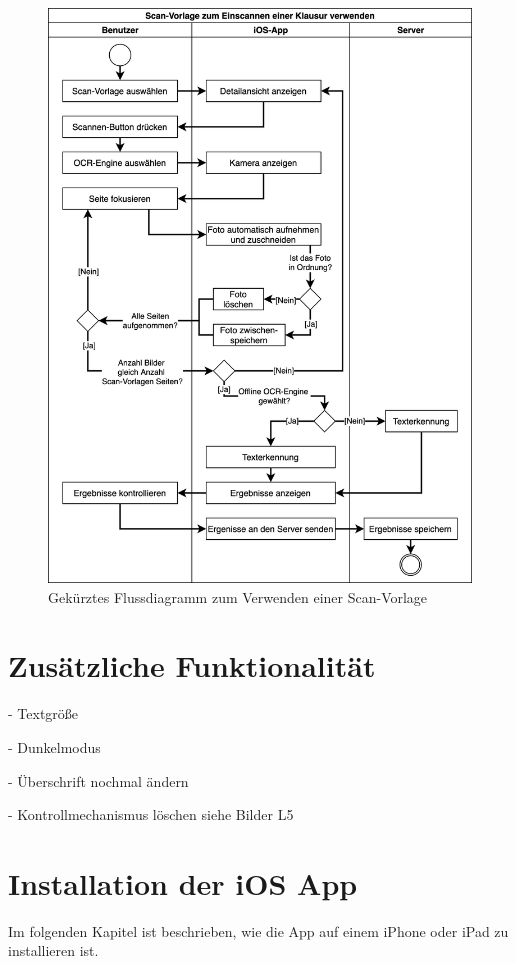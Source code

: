 \documentclass[notables, nomenclature, oneside, 150]{HSMW-Thesis}
\begin{document}
   	\begin{figure}[th]
   		\centering
   		\includegraphics[width=\textwidth,height=\textheight,keepaspectratio]{img/verwenden_flow}
   		\caption{Gekürztes Flussdiagramm zum Verwenden einer Scan-Vorlage}
   		\label{fig:verwenden_flow}
   	\end{figure}

	
\chapter{Zusätzliche Funktionalität} \label{ch:accses}
	
	- Textgröße
	
	- Dunkelmodus
	
	- Überschrift nochmal ändern
	
	- Kontrollmechanismus löschen siehe Bilder L5
	
	
\chapter{Installation der iOS App}\label{ch:installation}
	Im folgenden Kapitel ist beschrieben, wie die App auf einem iPhone oder iPad zu installieren ist.
	
\end{document}
